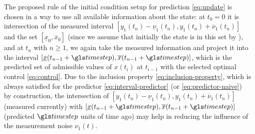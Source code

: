 The proposed rule of the initial condition setup for prediction \eqref{eq:update} is chosen in a way to use all available information about the state: at $t_{0}=0$ it is intersection of the measured interval $[y_{1}(t_{n})-\underline{\nu}_{1}(t_{n}),y_{1}(t_{n})+\overline{\nu}_{1}(t_{n})]$ and the set $[\underline{x}_{0},\overline{x}_{0}]$ (since we assume that initially the state is in this set by  ), and at $t_{n}$ with $n\geq1$, we again take the measured information and project it into the interval $[\underline{x}(t_{n-1}+\timestep),\overline{x}(t_{n-1}+\timestep)]$, which is the predicted set of admissible values of $x(t_{i})$ at $t_{i-1}$ with the selected optimal control \eqref{eq:control}. Due to the inclusion property \eqref{eq:inclusion-property}, which is always satisfied for the predictor \eqref{eq:interval-predictor} (or \eqref{eq:predictor-naive}) by construction, the intersection of $[y_{1}(t_{n})-\underline{\nu}_{1}(t_{n}),y_{1}(t_{n})+\overline{\nu}_{1}(t_{n})]$ (measured currently) with $[\underline{x}(t_{n-1}+\timestep),\overline{x}(t_{n-1}+\timestep)]$ (predicted $\timestep$ units of time ago) may help in reducing the influence of the measurement noise $\nu_{1}(t)$.

